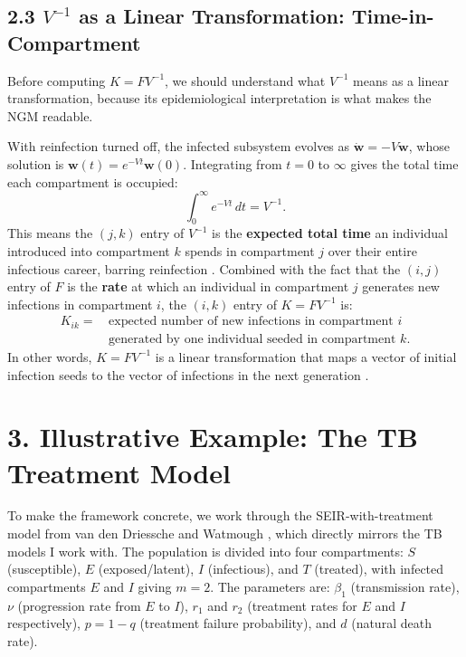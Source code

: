\documentclass[12pt]{article}
\theoremstyle{plain}
\theoremstyle{definition}
\begin{document}
\subsection*{2.3 \quad $V^{-1}$ as a Linear Transformation: Time-in-Compartment}

Before computing $K = FV^{-1}$, we should understand what $V^{-1}$ means as a linear
transformation, because its epidemiological interpretation is what makes the NGM readable.

With reinfection turned off, the infected subsystem evolves as $\dot{\mathbf{w}} = -V\mathbf{w}$,
whose solution is $\mathbf{w}(t) = e^{-Vt}\mathbf{w}(0)$. Integrating from $t = 0$ to
$\infty$ gives the total time each compartment is occupied:
\[
  \int_0^\infty e^{-Vt}\, dt = V^{-1}.
\]
This means the $(j,k)$ entry of $V^{-1}$ is the \textbf{expected total time} an individual
introduced into compartment $k$ spends in compartment $j$ over their entire infectious
career, barring reinfection \cite{vddriessche2002}. Combined with the fact that the $(i,j)$
entry of $F$ is the \textbf{rate} at which an individual in compartment $j$ generates new
infections in compartment $i$, the $(i,k)$ entry of $K = FV^{-1}$ is:
\begin{align*}
  K_{ik} = \,&\text{expected number of new infections in compartment } i \\
             &\text{generated by one individual seeded in compartment } k.
\end{align*}
In other words, $K = FV^{-1}$ is a linear transformation that maps a vector of initial
infection seeds to the vector of infections in the next generation \cite{diekmann1990}.

\section*{3. \quad Illustrative Example: The TB Treatment Model}

To make the framework concrete, we work through the SEIR-with-treatment model from
van den Driessche and Watmough \cite{vddriessche2002}, which directly mirrors the TB
models I work with. The population is divided into four compartments: $S$ (susceptible),
$E$ (exposed/latent), $I$ (infectious), and $T$ (treated), with infected compartments $E$
and $I$ giving $m = 2$. The parameters are: $\beta_1$ (transmission rate), $\nu$
(progression rate from $E$ to $I$), $r_1$ and $r_2$ (treatment rates for $E$ and $I$
respectively), $p = 1 - q$ (treatment failure probability), and $d$ (natural death rate).
\end{document}
